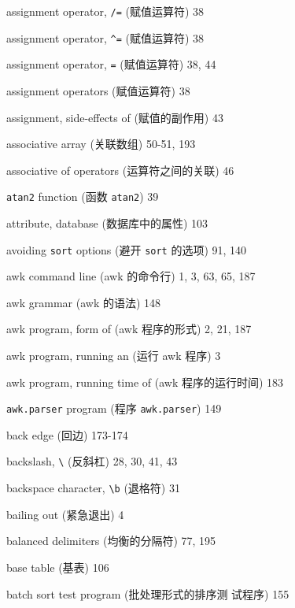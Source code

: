 \begin{multicols}{2}
\hangindent=2pc  assignment operator, \verb'/=' (赋值运算符) 38

\hangindent=2pc  assignment operator, \verb'^=' (赋值运算符) 38

\hangindent=2pc  assignment operator, \verb'=' (赋值运算符) 38, 44

\hangindent=2pc  assignment operators (赋值运算符) 38

\hangindent=2pc  assignment, side-effects of (赋值的副作用) 43

\hangindent=2pc  associative array (关联数组) 50-51, 193

\hangindent=2pc  associative of operators (运算符之间的关联) 46

\hangindent=2pc  \verb'atan2' function (函数 \verb'atan2') 39

\hangindent=2pc  attribute, database (数据库中的属性) 103

\hangindent=2pc  avoiding \verb'sort' options (避开 \verb'sort'
的选项) 91, 140

\hangindent=2pc  awk command line (awk 的命令行) 1, 3, 63, 65, 187

\hangindent=2pc  awk grammar (awk 的语法) 148

\hangindent=2pc  awk program, form of (awk 程序的形式) 2, 21, 187

\hangindent=2pc  awk program, running an (运行 awk 程序) 3

\hangindent=2pc  awk program, running time of (awk
程序的运行时间) 183

\hangindent=2pc  \verb'awk.parser' program (程序
\verb'awk.parser') 149

\hangindent=2pc  back edge (回边) 173-174

\hangindent=2pc  backslash, \verb'\' (反斜杠) 28, 30, 41, 43

\hangindent=2pc  backspace character, \verb'\b' (退格符) 31

\hangindent=2pc  bailing out (紧急退出) 4

\hangindent=2pc  balanced delimiters (均衡的分隔符) 77, 195

\hangindent=2pc  base table (基表) 106

\hangindent=2pc  batch sort test program (批处理形式的排序测
试程序) 155


\end{multicols}
